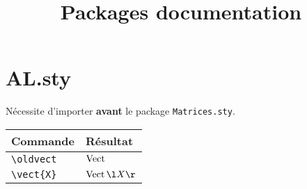 \documentclass[a4paper,12pt]{article}
\title{Packages documentation}
\author{}
\date{}
\renewcommand{\line}[1]{\verb|#1|&$#1$\\\hline}
\let\oldsection\section
\renewcommand\section{\clearpage\oldsection}
\begin{document}
\maketitle
\tableofcontents
\null\newpage
{}
\section{AL.sty}
Nécessite d'importer \textbf{avant} le package \texttt{Matrices.sty}.

\vspace{0.5cm}
\begin{tabularx}{\linewidth}{|Y|Z|}
    \hline
    \textbf{Commande} & \textbf{Résultat}\\
    \hline
    \line{\oldvect}
    \line{\vect{X}}

\end{tabularx}
\end{document}
